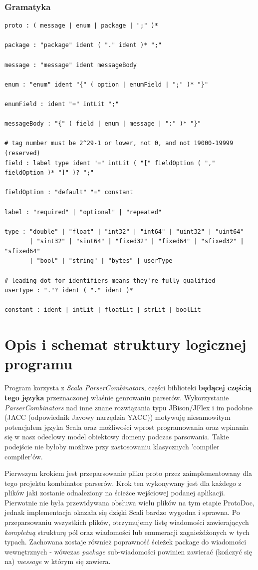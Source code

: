 \documentclass[a4paper]{article}
\begin{document}
\subsubsection{Gramatyka}
\begin{verbatim}
proto : ( message | enum | package | ";" )*

package : "package" ident ( "." ident )* ";"

message : "message" ident messageBody

enum : "enum" ident "{" ( option | enumField | ";" )* "}"

enumField : ident "=" intLit ";"

messageBody : "{" ( field | enum | message | ":" )* "}"

# tag number must be 2^29-1 or lower, not 0, and not 19000-19999 (reserved)
field : label type ident "=" intLit ( "[" fieldOption ( "," fieldOption )* "]" )? ";"

fieldOption : "default" "=" constant

label : "required" | "optional" | "repeated"

type : "double" | "float" | "int32" | "int64" | "uint32" | "uint64"
       | "sint32" | "sint64" | "fixed32" | "fixed64" | "sfixed32" | "sfixed64"
       | "bool" | "string" | "bytes" | userType

# leading dot for identifiers means they're fully qualified
userType : "."? ident ( "." ident )*

constant : ident | intLit | floatLit | strLit | boolLit
\end{verbatim}


\section{Opis i schemat struktury logicznej programu}
Program korzysta z \textit{Scala ParserCombinators}, części biblioteki \textbf{będącej częścią tego języka} przeznaczonej właśnie genrowaniu parserów.
Wykorzystanie \textit{ParserCombinators} nad inne znane rozwiązania typu JBison/JFlex i im podobne (JACC (odpowiednik Javowy narzędzia YACC)) motywuję
niesamowitym potencjałem języka Scala oraz możliwości wprost programowania oraz wpinania się w nasz odeclowy model obiektowy domeny podczas parsowania.
Takie podejście nie byłoby możliwe przy zastosowaniu klasycznych 'compiler compiler'ów.

Pierwszym krokiem jest przeparsowanie pliku proto przez zaimplementowany dla tego projektu kombinator parserów. Krok ten wykonywany 
jest dla każdego z plików jaki zostanie odnaleziony na ścieżce wejściowej podanej aplikacji. Pierwotnie nie była przewidywana obsłuwa wielu 
plików na tym etapie ProtoDoc, jednak implementacja okazała się dzięki Scali bardzo wygodna i sprawna. Po przeparsowaniu wszystkich plików, 
otrzymujemy listę wiadomości zawierających \textit{kompletną} strukturę pól oraz wiadomości lub enumeracji zagnieżdżonych w tych typach. 
Zachowana zostaje również poprawność ścieżek package do wiadomości wewnętrznych - wówczas \textit{package} sub-wiadomości powinien zawierać (kończyć się na) 
\textit{message} w którym się zawiera.
\end{document}
